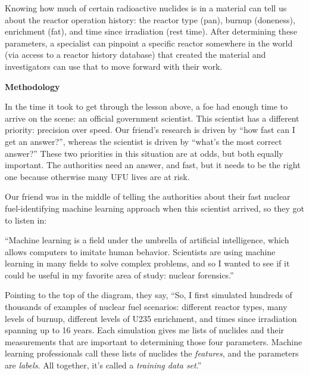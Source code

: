 {Knowing how much of certain radioactive nuclides is in a material can
tell us about the reactor operation history: the reactor type (pan), burnup
(doneness), enrichment (fat), and time since irradiation (rest time). After
determining these parameters, a specialist can pinpoint a specific reactor
somewhere in the world (via access to a reactor history database) that created
the material and investigators can use that to move forward with their work.

\begin{tcolorbox}[halign=center]
\textbf{Methodology}
\end{tcolorbox}

\begin{shadequote}

  In the time it took to get through the lesson above, a foe had enough time to
  arrive on the scene: an official government scientist. This scientist has a
  different priority: precision over speed. Our friend's research is driven by
  ``how fast can I get an answer?'', whereas the scientist is driven by
  ``what's the most correct answer?'' These two priorities in this situation
  are at odds, but both equally important. The authorities need an answer, and
  fast, but it needs to be the right one because otherwise many UFU lives are
  at risk.
  
  Our friend was in the middle of telling the authorities about their fast
  nuclear fuel-identifying machine learning approach when this scientist
  arrived, so they got to listen in:
  
  ``Machine learning is a field under the umbrella of artificial intelligence,
  which allows computers to imitate human behavior. Scientists are using
  machine learning in many fields to solve complex problems, and so I wanted to
  see if it could be useful in my favorite area of study: nuclear forensics.''
  
  Pointing to the top of the diagram, they say, ``So, I first simulated hundreds
  of thousands of examples of nuclear fuel scenarios: different reactor types,
  many levels of burnup, different levels of \gls{U235} enrichment, and times
  since irradiation spanning up to 16 years.  Each simulation gives me lists of
  nuclides and their measurements that are important to determining those four
  parameters.  Machine learning professionals call these lists of nuclides the
  \textit{features}, and the parameters are \textit{labels}. All together, it's
  called a \textit{training data set}.''
  

\end{shadequote}}
